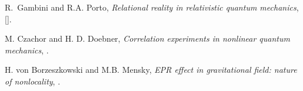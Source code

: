 \documentclass[published]{JHEP3}
\begin{document}
\begin{thebibliography}{99}

R.~Gambini and R.A. Porto, \emph{Relational reality in relativistic
  quantum mechanics},  [].



M. Czachor and H. D. Doebner, \emph{Correlation experiments in
  nonlinear quantum mechanics}, .



H. von Borzeszkowski and M.B. Mensky, \emph{EPR effect in
  gravitational field: nature of nonlocality}, .

\end{thebibliography}
\end{document}
